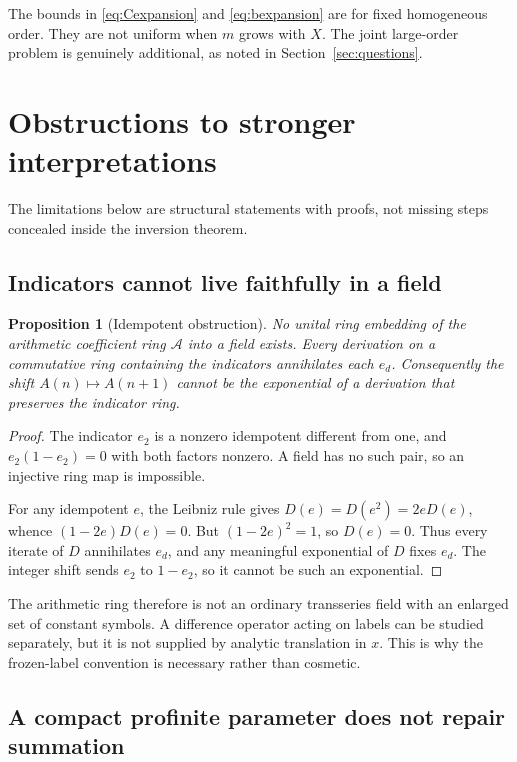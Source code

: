 \documentclass[11pt,a4paper]{article}
\numberwithin{equation}{section}
\newtheorem{proposition}[theorem]{Proposition}
\theoremstyle{definition}
\theoremstyle{remark}
\newcommand{\A}{\mathcal A}
\begin{document}
The bounds in \eqref{eq:Cexpansion} and \eqref{eq:bexpansion} are for
fixed homogeneous order. They are not uniform when $m$ grows with $X$.
The joint large-order problem is genuinely additional, as noted in
Section~\ref{sec:questions}.

\section{Obstructions to stronger interpretations}\label{sec:obstructions}

The limitations below are structural statements with proofs, not missing
steps concealed inside the inversion theorem.

\subsection{Indicators cannot live faithfully in a field}

\begin{proposition}[Idempotent obstruction]\label{prop:idempotent}
No unital ring embedding of the arithmetic coefficient ring $\A$ into a
field exists. Every derivation on a commutative ring containing the
indicators annihilates each $e_d$. Consequently the shift
$A(n)\mapsto A(n+1)$ cannot be the exponential of a derivation that
preserves the indicator ring.
\end{proposition}
\begin{proof}
The indicator $e_2$ is a nonzero idempotent different from one, and
$e_2(1-e_2)=0$ with both factors nonzero. A field has no such pair,
so an injective ring map is impossible.

For any idempotent $e$, the Leibniz rule gives
$D(e)=D(e^2)=2eD(e)$, whence $(1-2e)D(e)=0$.
But $(1-2e)^2=1$, so $D(e)=0$. Thus every iterate of $D$ annihilates
$e_d$, and any meaningful exponential of $D$ fixes $e_d$. The integer
shift sends $e_2$ to $1-e_2$, so it cannot be such an exponential.
\end{proof}

The arithmetic ring therefore is not an ordinary transseries field with
an enlarged set of constant symbols. A difference operator acting on
labels can be studied separately, but it is not supplied by analytic
translation in $x$. This is why the frozen-label convention is necessary
rather than cosmetic.

\subsection{A compact profinite parameter does not repair summation}
\end{document}
